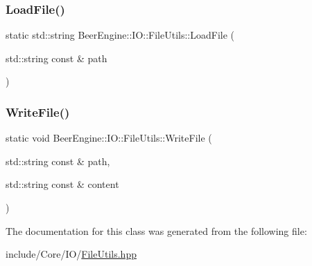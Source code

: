\subsubsection{\texorpdfstring{Load\+File()}{LoadFile()}}
{\footnotesize\ttfamily static std\+::string Beer\+Engine\+::\+I\+O\+::\+File\+Utils\+::\+Load\+File (\begin{DoxyParamCaption}\item[{std\+::string const \&}]{path }\end{DoxyParamCaption})\hspace{0.3cm}{\ttfamily [static]}}

\mbox{\label{class_beer_engine_1_1_i_o_1_1_file_utils_ac58ded74238ff6180e72e4b2f0be6b81}} 
\subsubsection{\texorpdfstring{Write\+File()}{WriteFile()}}
{\footnotesize\ttfamily static void Beer\+Engine\+::\+I\+O\+::\+File\+Utils\+::\+Write\+File (\begin{DoxyParamCaption}\item[{std\+::string const \&}]{path,  }\item[{std\+::string const \&}]{content }\end{DoxyParamCaption})\hspace{0.3cm}{\ttfamily [static]}}



The documentation for this class was generated from the following file\+:\begin{DoxyCompactItemize}
\item 
include/\+Core/\+I\+O/\mbox{\hyperlink{_file_utils_8hpp}{File\+Utils.\+hpp}}\end{DoxyCompactItemize}
